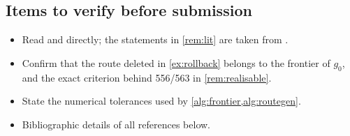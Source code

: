 \documentclass[11pt]{article}
\theoremstyle{definition}
\theoremstyle{remark}
\begin{document}
\FloatBarrier
\subsection{Items to verify before submission}

\begin{itemize}[leftmargin=1.4em, itemsep=1pt]
\item Read \citet{sol1994column} and \citet{vanderbeck1994thesis} directly; the
statements in \cref{rem:lit} are taken from \citet{lubbecke2005selected}.
\item Confirm that the route deleted in \cref{ex:rollback} belongs to the
frontier of $g_0$, and the exact criterion behind 556/563 in
\cref{rem:realisable}.
\item State the numerical tolerances used by \cref{alg:frontier,alg:routegen}.
\item Bibliographic details of all references below.
\end{itemize}
\end{document}
